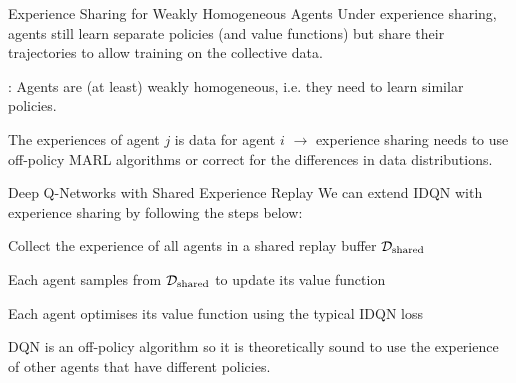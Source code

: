 %
%
%
%

\begin{frame}{Experience Sharing for Weakly Homogeneous Agents}
    Under experience sharing, agents still learn separate policies (and value functions) but share their trajectories to allow training on the collective data.

    \pause

    : Agents are (at least) weakly homogeneous, i.e. they need to learn similar policies.

    \pause

    \begin{notebox}
        The experiences of agent $j$ is  data for agent $i$ $\rightarrow$ experience sharing needs to use off-policy MARL algorithms or correct for the differences in data distributions.
    \end{notebox}
\end{frame}

\begin{frame}{Deep Q-Networks with Shared Experience Replay}
    We can extend IDQN with experience sharing by following the steps below:
    \blist
        \item Collect the experience of all agents in a shared replay buffer $\mathcal{D}_{\text{shared}}$
        \item Each agent samples from $\mathcal{D}_{\text{shared}}$ to update its value function
        \item Each agent optimises its value function using the typical IDQN loss
    \elist

    \pause

    \begin{notebox}
        DQN is an off-policy algorithm so it is theoretically sound to use the experience of other agents that have different policies.
    \end{notebox}
\end{frame}

